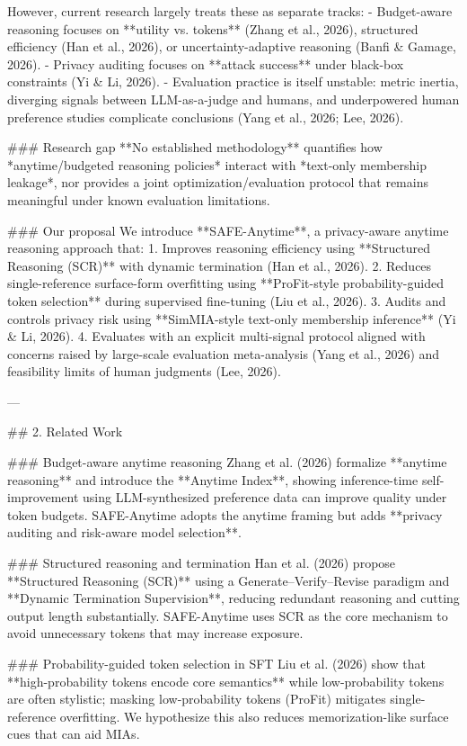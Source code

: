 However, current research largely treats these as separate tracks:
- Budget-aware reasoning focuses on **utility vs. tokens** (Zhang et al., 2026), structured efficiency (Han et al., 2026), or uncertainty-adaptive reasoning (Banfi & Gamage, 2026).  
- Privacy auditing focuses on **attack success** under black-box constraints (Yi & Li, 2026).  
- Evaluation practice is itself unstable: metric inertia, diverging signals between LLM-as-a-judge and humans, and underpowered human preference studies complicate conclusions (Yang et al., 2026; Lee, 2026).  

### Research gap  
**No established methodology** quantifies how *anytime/budgeted reasoning policies* interact with *text-only membership leakage*, nor provides a joint optimization/evaluation protocol that remains meaningful under known evaluation limitations.

### Our proposal  
We introduce **SAFE-Anytime**, a privacy-aware anytime reasoning approach that:
1. Improves reasoning efficiency using **Structured Reasoning (SCR)** with dynamic termination (Han et al., 2026).  
2. Reduces single-reference surface-form overfitting using **ProFit-style probability-guided token selection** during supervised fine-tuning (Liu et al., 2026).  
3. Audits and controls privacy risk using **SimMIA-style text-only membership inference** (Yi & Li, 2026).  
4. Evaluates with an explicit multi-signal protocol aligned with concerns raised by large-scale evaluation meta-analysis (Yang et al., 2026) and feasibility limits of human judgments (Lee, 2026).

---

## 2. Related Work  

### Budget-aware anytime reasoning  
Zhang et al. (2026) formalize **anytime reasoning** and introduce the **Anytime Index**, showing inference-time self-improvement using LLM-synthesized preference data can improve quality under token budgets. SAFE-Anytime adopts the anytime framing but adds **privacy auditing and risk-aware model selection**.

### Structured reasoning and termination  
Han et al. (2026) propose **Structured Reasoning (SCR)** using a Generate–Verify–Revise paradigm and **Dynamic Termination Supervision**, reducing redundant reasoning and cutting output length substantially. SAFE-Anytime uses SCR as the core mechanism to avoid unnecessary tokens that may increase exposure.

### Probability-guided token selection in SFT  
Liu et al. (2026) show that **high-probability tokens encode core semantics** while low-probability tokens are often stylistic; masking low-probability tokens (ProFit) mitigates single-reference overfitting. We hypothesize this also reduces memorization-like surface cues that can aid MIAs.

